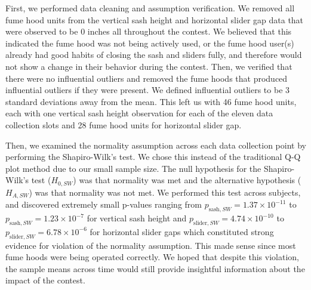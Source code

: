 \documentclass[12pt, twocolumn]{article}
\begin{document}
First, we performed data cleaning and assumption verification. We removed all fume hood units from the vertical sash height and horizontal slider gap data that were observed to be 0 inches all throughout the contest. We believed that this indicated the fume hood was not being actively used, or the fume hood user(s) already had good habits of closing the sash and sliders fully, and therefore would not show a change in their behavior during the contest. Then, we verified that there were no influential outliers and removed the fume hoods that produced influential outliers if they were present. We defined influential outliers to be 3 standard deviations away from the mean. This left us with 46 fume hood units, each with one vertical sash height observation for each of the eleven data collection slots and 28 fume hood units for horizontal slider gap.   

Then, we examined the normality assumption across each data collection point by performing the Shapiro-Wilk's test. We chose this instead of the traditional Q-Q plot method due to our small sample size. The null hypothesis for the Shapiro-Wilk's test ($H_{0, SW}$) was that normality was met and the alternative hypothesis ($H_{A, SW}$) was that normality was not met. We performed this test across subjects, and discovered extremely small p-values ranging from $p_{\text{sash}, SW} = 1.37 \times 10^{-11}$ to $p_{\text{sash}, SW}  = 1.23 \times 10^{-7}$ for vertical sash height and $p_{\text{slider}, SW} = 4.74 \times 10^{-10}$ to $p_{\text{slider}, SW} =  6.78 \times 10^{-6}$ for horizontal slider gaps which constituted strong evidence for violation of the normality assumption.  This made sense since most fume hoods were being operated correctly. We hoped that despite this violation, the sample means across time would still provide insightful information about the impact of the contest. 
\end{document}

